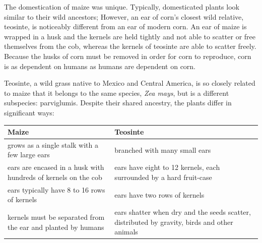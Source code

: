 \documentclass[12pt,]{article}
\begin{document}
The domestication of maize was unique. Typically, domesticated plants look similar to their wild ancestors; However, an ear of corn's closest wild relative, teosinte, is noticeably different from an ear of modern corn. An ear of maize is wrapped in a husk and the kernels are held tightly and not able to scatter or free themselves from the cob, whereas the kernels of teosinte are able to scatter freely. Because the husks of corn must be removed in order for corn to reproduce, corn is as dependent on humans as humans are dependent on corn.

Teosinte, a wild grass native to Mexico and Central America, is so closely related to maize that it belongs to the same species, \emph{Zea mays}, but is a different subspecies: parviglumis. Despite their shared ancestry, the plants differ in significant ways:

\begin{longtable}[]{@{}ll@{}}
\toprule
\begin{minipage}[b]{0.47\columnwidth}\raggedright
\textbf{Maize}\strut
\end{minipage} & \begin{minipage}[b]{0.47\columnwidth}\raggedright
\textbf{Teosinte}\strut
\end{minipage}\tabularnewline
\midrule
\endhead
\begin{minipage}[t]{0.47\columnwidth}\raggedright
grows as a single stalk with a few large ears\strut
\end{minipage} & \begin{minipage}[t]{0.47\columnwidth}\raggedright
branched with many small ears\strut
\end{minipage}\tabularnewline
\begin{minipage}[t]{0.47\columnwidth}\raggedright
ears are encased in a husk with hundreds of kernels on the cob\strut
\end{minipage} & \begin{minipage}[t]{0.47\columnwidth}\raggedright
ears have eight to 12 kernels, each surrounded by a hard fruit-case\strut
\end{minipage}\tabularnewline
\begin{minipage}[t]{0.47\columnwidth}\raggedright
ears typically have 8 to 16 rows of kernels\strut
\end{minipage} & \begin{minipage}[t]{0.47\columnwidth}\raggedright
ears have two rows of kernels\strut
\end{minipage}\tabularnewline
\begin{minipage}[t]{0.47\columnwidth}\raggedright
kernels must be separated from the ear and planted by humans\strut
\end{minipage} & \begin{minipage}[t]{0.47\columnwidth}\raggedright
ears shatter when dry and the seeds scatter, distributed by gravity, birds and other animals\strut
\end{minipage}\tabularnewline
\bottomrule
\end{longtable}
\end{document}
